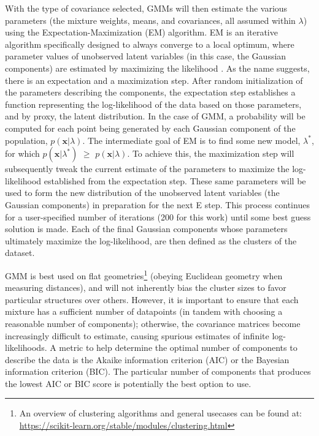\documentclass[fleqn,usenatbib,useAMS]{mnras}
\begin{document}
With the type of covariance selected, GMMs will then estimate the various parameters (the mixture weights, means, and covariances, all assumed within $\lambda$) using the Expectation-Maximization (EM) algorithm. EM is an iterative algorithm specifically designed to always converge to a local optimum, where parameter values of unobserved latent variables (in this case, the Gaussian components) are estimated by maximizing the likelihood \citep{Dempster77}. As the name suggests, there is an expectation and a maximization step. After random initialization of the parameters describing the components, the expectation step establishes a function representing the log-likelihood of the data based on those parameters, and by proxy, the latent distribution. In the case of GMM, a probability will be computed for each point being generated by each Gaussian component of the population, $p(\textbf{x}|\lambda)$. The intermediate goal of EM is to find some new model, $\lambda^*$, for which $p(\textbf{x}|\lambda^*)$ $\geq$ $p(\textbf{x}|\lambda)$. To achieve this, the maximization step will subsequently tweak the current estimate of the parameters to maximize the log-likelihood established from the expectation step. These same parameters will be used to form the new distribution of the unobserved latent variables (the Gaussian components) in preparation for the next E step. This process continues for a user-specified number of iterations (200 for this work) until some best guess solution is made. Each of the final Gaussian components whose parameters ultimately maximize the log-likelihood, are then defined as the clusters of the dataset. \par   

GMM is best used on flat geometries\footnote{An overview of clustering algorithms and general usecases can be found at: \url{https://scikit-learn.org/stable/modules/clustering.html}} (obeying Euclidean geometry when measuring distances), and will not inherently bias the cluster sizes to favor particular structures over others. However, it is important to ensure that each mixture has a sufficient number of datapoints (in tandem with choosing a reasonable number of components); otherwise, the covariance matrices become increasingly difficult to estimate, causing spurious estimates of infinite log-likelihoods. A metric to help determine the optimal number of components to describe the data is the Akaike information criterion (AIC) or the Bayesian information criterion (BIC). The particular number of components that produces the lowest AIC or BIC score is potentially the best option to use. \par
\end{document}
